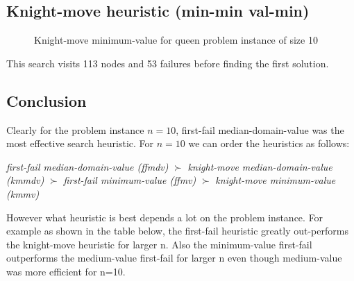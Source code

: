 \documentclass[a4paper, 11pt]{article}
\begin{document}
\subsection*{Knight-move heuristic (min-min val-min)}
\begin{figure}[H]
  \begin{center}
    \caption{Knight-move minimum-value for queen problem instance of size 10}
    \label{fig:kmv10}
  \end{center}
\end{figure}
This search visits 113 nodes and 53 failures before finding the first solution.

\subsection*{Conclusion}
Clearly for the problem instance $n = 10$, first-fail median-domain-value was the most effective search heuristic. For $n=10$ we can order the heuristics as follows:

\textit{first-fail median-domain-value (ffmdv)} $\succ$ \textit{knight-move median-domain-value (kmmdv)} $\succ$ \textit{first-fail minimum-value (ffmv)} $\succ$ \textit{knight-move minimum-value (kmmv)}

However what heuristic is best depends a lot on the problem instance. For example as shown in the table below, the first-fail heuristic greatly out-performs the knight-move heuristic for larger n. Also the minimum-value first-fail outperforms the medium-value first-fail for larger n even though medium-value was more efficient for n=10.
\end{document}
